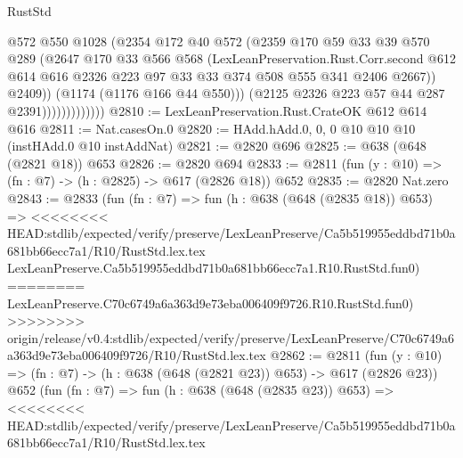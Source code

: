 \begin{lexlean}{RustStd}
\begin{coremodule}
{\begin{coremodule}
{{{{{{{{                              @572
                              @550
                              @1028
                              (@2354
                                @172
                                @40
                                @572
                                (@2359
                                  @170
                                  @59
                                  @33
                                  @39
                                  @570
                                  @289
                                  (@2647
                                    @170
                                    @33
                                    @566
                                    @568
                                    (LexLeanPreservation.Rust.Corr.second
                                      @612
                                      @614
                                      @616
                                      @2326
                                      @223
                                      @97
                                      @33
                                      @33
                                      @374
                                      @508
                                      @555
                                      @341
                                      @2406
                                      @2667))
                                  @2409))
                              (@1174 (@1176 @166 @44 @550)))
                            (@2125 @2326 @223 @57 @44 @287 @2391)))))))))))))
@2810 := LexLeanPreservation.Rust.CrateOK @612 @614 @616
@2811 := Nat.casesOn.{0}
@2820 := HAdd.hAdd.{0, 0, 0} @10 @10 @10 (instHAdd.{0} @10 instAddNat)
@2821 := @2820 @696
@2825 := @638 (@648 (@2821 @18)) @653
@2826 := @2820 @694
@2833 := @2811 (fun (y : @10) => (fn : @7) -> (h : @2825) -> @617 (@2826 @18)) @652
@2835 := @2820 Nat.zero
@2843 := @2833
    (fun (fn : @7) =>
    fun (h : @638 (@648 (@2835 @18)) @653) =>
<<<<<<<< HEAD:stdlib/expected/verify/preserve/LexLeanPreserve/Ca5b519955eddbd71b0a681bb66ecc7a1/R10/RustStd.lex.tex
    LexLeanPreserve.Ca5b519955eddbd71b0a681bb66ecc7a1.R10.RustStd.fun0)
========
    LexLeanPreserve.C70c6749a6a363d9e73eba006409f9726.R10.RustStd.fun0)
>>>>>>>> origin/release/v0.4:stdlib/expected/verify/preserve/LexLeanPreserve/C70c6749a6a363d9e73eba006409f9726/R10/RustStd.lex.tex
@2862 := @2811
    (fun (y : @10) => (fn : @7) -> (h : @638 (@648 (@2821 @23)) @653) -> @617 (@2826 @23))
    @652
    (fun (fn : @7) =>
    fun (h : @638 (@648 (@2835 @23)) @653) =>
<<<<<<<< HEAD:stdlib/expected/verify/preserve/LexLeanPreserve/Ca5b519955eddbd71b0a681bb66ecc7a1/R10/RustStd.lex.tex
}}}}}}}}
\end{coremodule}}
\end{coremodule}
\end{lexlean}
